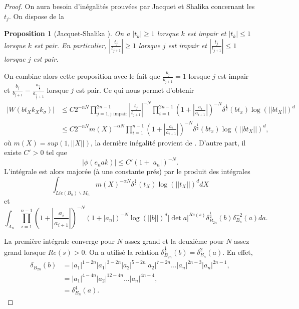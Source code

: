 \documentclass{amsart}
\newtheorem{proposition}{Proposition}[section]
\begin{document}
\begin{proof}
 On aura besoin d'inégalités prouvées par Jacquet et Shalika concernant les $t_j$. On dispose de la
 \begin{proposition}[Jacquet-Shalika \cite{jacquet-shalika}]
 On a $|t_k| \geq 1$ lorsque $k$ est impair et $|t_k| \leq 1$ lorsque $k$ est pair. En particulier, $|\frac{t_j}{t_{j+1}}| \geq 1$ lorsque $j$ est impair et $|\frac{t_j}{t_{j+1}}| \leq 1$ lorsque $j$ est pair.
 \end{proposition}
 
 On combine alors cette proposition avec le fait que $\frac{b_j}{b_{j+1}} = 1$ lorsque $j$ est impair et $\frac{b_j}{b_{j+1}} = \frac{a_\frac{j}{2}}{a_{\frac{j}{2}+1}}$ lorsque $j$ est pair. Ce qui nous permet d'obtenir
 \begin{align}
 |W(bt_Xk_Xk_\sigma)| &\leq C 2^{-nN} \prod_{j=1, \text{j impair}}^{2n-1} |\frac{t_j}{t_{j+1}}|^{-N} \prod_{i=1}^{2n-1} (1 + |\frac{a_i}{a_{i+1}}|)^{-N} \delta^{\frac{1}{2}}(bt_x)\log(||bt_X||)^d \\
 &\leq C 2^{-nN} m(X)^{-\alpha N} \prod_{i=1}^{n-1} (1 + |\frac{a_i}{a_{i+1}}|)^{-N} \delta^{\frac{1}{2}}(bt_x)\log(||bt_X||)^d,
 \end{align}
 où $m(X) = sup(1, ||X||)$, la dernière inégalité provient de \cite[section 5.5]{jacquet-shalika}. D'autre part, il existe $C' > 0$ tel que
 \begin{equation}
 |\phi(e_nak)| \leq C'(1+|a_n|)^{-N}.
 \end{equation}
 L'intégrale est alors majorée (à une constante prés) par le produit des intégrales
 \begin{equation}
 \int_{Lie(B_n)\backslash{M_n}} m(X)^{-\alpha N} \delta^{\frac{1}{2}}(t_X)\log(||t_X||)^d dX
 \end{equation}
 et
 \begin{equation}
 \int_{A_n}  \prod_{i=1}^{n-1} (1+ |\frac{a_i}{a_{i+1}}|)^{-N} (1+|a_n|)^{-N}\log(||b||)^d|\det a|^{Re(s)} \delta_{B_{2n}}^{\frac{1}{2}}(b)\delta_{B_n}^{-2}(a) da.
 \end{equation}
 
 La première intégrale converge pour $N$ assez grand et la deuxième pour $N$ assez grand lorsque $Re(s) > 0$. On a utilisé la relation $\delta_{B_{2n}}^{\frac{1}{2}}(b) = \delta_{B_n}^2(a)$. En effet,
 \begin{align}
 \delta_{B_{2n}}(b) &= |a_1|^{1-2n}|a_1|^{3-2n}|a_2|^{5-2n}|a_2|^{7-2n}...|a_n|^{2n-3}|a_n|^{2n-1}, \\
 &= |a_1|^{4-4n}|a_2|^{12-4n}...|a_n|^{4n-4},\\
 &= \delta_{B_n}^4(a).
 \end{align}
  \end{proof}
  
\end{document}
